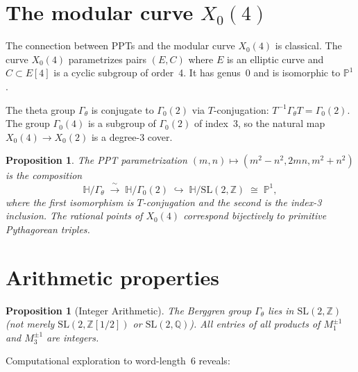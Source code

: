 \documentclass[12pt]{amsart}
\newtheorem{proposition}[theorem]{Proposition}
\theoremstyle{definition}
\theoremstyle{remark}
\newcommand{\SL}{\mathrm{SL}}
\newcommand{\Z}{\mathbb{Z}}
\newcommand{\HH}{\mathbb{H}}
\begin{document}
\section{The modular curve $X_0(4)$}\label{sec:x04}

The connection between PPTs and the modular curve $X_0(4)$ is classical.
The curve $X_0(4)$ parametrizes pairs $(E, C)$ where $E$ is an
elliptic curve and $C \subset E[4]$ is a cyclic subgroup of order~4.
It has genus~0 and is isomorphic to $\mathbb{P}^1$.

The theta group $\Gamma_\theta$ is conjugate to $\Gamma_0(2)$ via
$T$-conjugation: $T^{-1}\Gamma_\theta T = \Gamma_0(2)$.  The group
$\Gamma_0(4)$ is a subgroup of $\Gamma_0(2)$ of index~3, so the
natural map $X_0(4) \to X_0(2)$ is a degree-3 cover.

\begin{proposition}
The PPT parametrization $(m,n) \mapsto (m^2-n^2, 2mn, m^2+n^2)$ is
the composition
\[
\HH / \Gamma_\theta \;\xrightarrow{\;\sim\;}\;
\HH / \Gamma_0(2) \;\hookrightarrow\;
\HH / \SL(2,\Z)
\;\cong\; \mathbb{P}^1,
\]
where the first isomorphism is $T$-conjugation and the second is the
index-3 inclusion.  The rational points of $X_0(4)$ correspond
bijectively to primitive Pythagorean triples.
\end{proposition}

\section{Arithmetic properties}\label{sec:arithmetic}

\begin{proposition}[Integer Arithmetic]\label{prop:arith}
The Berggren group $\Gamma_\theta$ lies in $\SL(2,\Z)$ (not merely
$\SL(2,\Z[1/2])$ or $\SL(2,\mathbb{Q})$).  All entries of all
products of $M_1^{\pm1}$ and $M_3^{\pm1}$ are integers.
\end{proposition}

Computational exploration to word-length~6 reveals:
\end{document}
